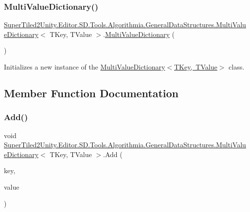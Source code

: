 \subsubsection{\texorpdfstring{Multi\+Value\+Dictionary()}{MultiValueDictionary()}}
{\footnotesize\ttfamily \mbox{\hyperlink{class_super_tiled2_unity_1_1_editor_1_1_s_d_1_1_tools_1_1_algorithmia_1_1_general_data_structures_1_1_multi_value_dictionary}{Super\+Tiled2\+Unity.\+Editor.\+S\+D.\+Tools.\+Algorithmia.\+General\+Data\+Structures.\+Multi\+Value\+Dictionary}}$<$ T\+Key, T\+Value $>$.\mbox{\hyperlink{class_super_tiled2_unity_1_1_editor_1_1_s_d_1_1_tools_1_1_algorithmia_1_1_general_data_structures_1_1_multi_value_dictionary}{Multi\+Value\+Dictionary}} (\begin{DoxyParamCaption}{ }\end{DoxyParamCaption})}



Initializes a new instance of the \mbox{\hyperlink{class_super_tiled2_unity_1_1_editor_1_1_s_d_1_1_tools_1_1_algorithmia_1_1_general_data_structures_1_1_multi_value_dictionary_a88bdd33727b767235b716c268c4a52d2}{Multi\+Value\+Dictionary$<$\+T\+Key, T\+Value$>$}} class. 



\subsection{Member Function Documentation}
\mbox{\label{class_super_tiled2_unity_1_1_editor_1_1_s_d_1_1_tools_1_1_algorithmia_1_1_general_data_structures_1_1_multi_value_dictionary_ab8022bd65275815aa9f61cbe33c07fab}} 
\subsubsection{\texorpdfstring{Add()}{Add()}}
{\footnotesize\ttfamily void \mbox{\hyperlink{class_super_tiled2_unity_1_1_editor_1_1_s_d_1_1_tools_1_1_algorithmia_1_1_general_data_structures_1_1_multi_value_dictionary}{Super\+Tiled2\+Unity.\+Editor.\+S\+D.\+Tools.\+Algorithmia.\+General\+Data\+Structures.\+Multi\+Value\+Dictionary}}$<$ T\+Key, T\+Value $>$.Add (\begin{DoxyParamCaption}\item[{T\+Key}]{key,  }\item[{T\+Value}]{value }\end{DoxyParamCaption})}



